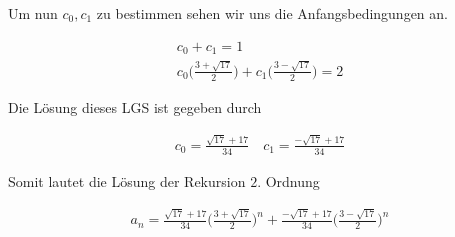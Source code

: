 \begin{solution}
  Um nun $c_0, c_1$ zu bestimmen sehen wir uns die Anfangsbedingungen an.

  \begin{align*}
    c_0 + c_1 = 1 \\
    c_0 \Big(\frac{3 +\sqrt{17}}{2}\Big) + c_1\Big(\frac{3 -\sqrt{17}}{2}\Big) = 2
  \end{align*}

  Die Lösung dieses LGS ist gegeben durch

  \begin{align*}
    c_0 = \frac{\sqrt{17} + 17}{34} \quad
    c_1 = \frac{-\sqrt{17} +17}{34}
  \end{align*}

  Somit lautet die Lösung der Rekursion $2.$ Ordnung

  \begin{align*}
  a_n
  =
  \frac{\sqrt{17} + 17}{34} \Big(\frac{3 +\sqrt{17}}{2}\Big)^n
    + \frac{-\sqrt{17} +17}{34} \Big(\frac{3 -\sqrt{17}}{2}\Big)^n
  \end{align*}
\end{solution}

